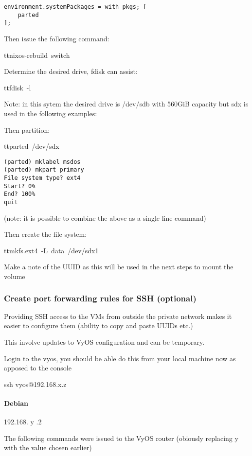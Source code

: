 \begin{verbatim}
environment.systemPackages = with pkgs; [
    parted
];
\end{verbatim}

Then issue the following command:

tt{nixos-rebuild\ switch}

Determine the desired drive, fdisk can assist:

tt{fdisk\ -l}

Note: in this sytem the desired drive is /dev/sdb with 560GiB capacity
but sdx is used in the following examples:

Then partition:

tt{parted\ /dev/sdx}

\begin{verbatim}
(parted) mklabel msdos
(parted) mkpart primary
File system type? ext4
Start? 0%
End? 100%
quit
\end{verbatim}

(note: it is possible to combine the above as a single line command)

Then create the file system:

tt{mkfs.ext4\ -L\ data\ /dev/sdx1}

Make a note of the UUID as this will be used in the next steps to mount
the volume

\hypertarget{create-port-forwarding-rules-for-ssh-optional}{%
\subsubsection{Create port forwarding rules for SSH
(optional)}\label{create-port-forwarding-rules-for-ssh-optional}}

Providing SSH access to the VMs from outside the private network makes
it easier to configure them (ability to copy and paste UUIDs etc.)

This involve updates to VyOS configuration and can be temporary.

Login to the vyos, you should be able do this from your local machine
now as apposed to the console

ssh vyos@192.168.x.z

\hypertarget{debian}{%
\paragraph{Debian}\label{debian}}

192.168. y .2

The following commands were issued to the VyOS router (obiously
replacing y with the value chosen earlier)

